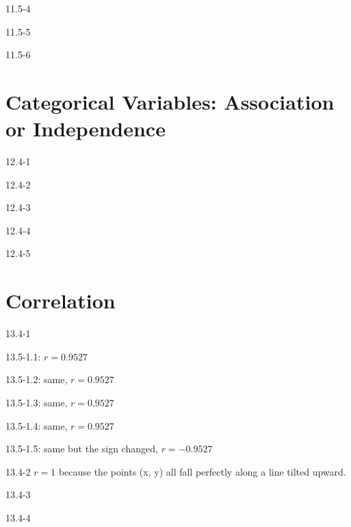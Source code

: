 \begin{exsol@solution}{11.5-4}

\end{exsol@solution}
\begin{exsol@solution}{11.5-5}
\end{exsol@solution}
\begin{exsol@solution}{11.5-6}
\end{exsol@solution}
\setcounter{chapter}{12}\chapter{Categorical Variables: Association or Independence}
\begin{exsol@solution}{12.4-1}
\end{exsol@solution}
\begin{exsol@solution}{12.4-2}
\end{exsol@solution}
\begin{exsol@solution}{12.4-3}
\end{exsol@solution}
\begin{exsol@solution}{12.4-4}
\end{exsol@solution}
\begin{exsol@solution}{12.4-5}
\end{exsol@solution}
\setcounter{chapter}{13}\chapter{Correlation}
\begin{exsol@solution}{13.4-1}


13.5-1.1: $r = 0.9527 $

13.5-1.2: same, $r = 0.9527 $

13.5-1.3: same, $r = 0.9527 $

13.5-1.4: same, $r = 0.9527 $

13.5-1.5: same but the sign changed, $r = -0.9527 $

\end{exsol@solution}
\begin{exsol@solution}{13.4-2}
$r = 1$ because the points (x, y) all fall perfectly along a line tilted upward.

\end{exsol@solution}
\begin{exsol@solution}{13.4-3}
\end{exsol@solution}
\begin{exsol@solution}{13.4-4}

\end{exsol@solution}
